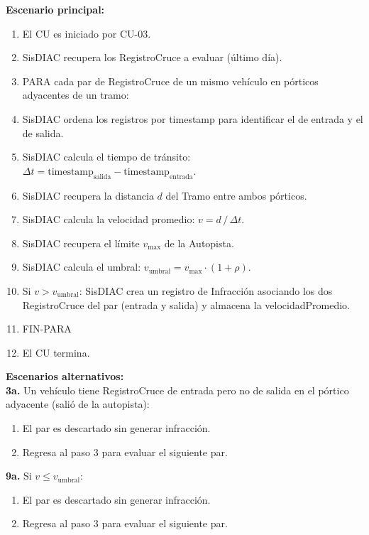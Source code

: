 \documentclass[12pt,letterpaper]{article}
\begin{document}
\noindent \textbf{Escenario principal:}
\begin{enumerate}[nosep, leftmargin=*]
	\item El CU es iniciado por CU-03.
	\item SisDIAC recupera los RegistroCruce a evaluar (último día).
	\item PARA cada par de RegistroCruce de un mismo vehículo en pórticos adyacentes de un tramo:
	\item SisDIAC ordena los registros por timestamp para identificar el de entrada y el de salida.
	\item SisDIAC calcula el tiempo de tránsito: $\Delta t = \text{timestamp}_{\text{salida}} - \text{timestamp}_{\text{entrada}}$.
	\item SisDIAC recupera la distancia $d$ del Tramo entre ambos pórticos.
	\item SisDIAC calcula la velocidad promedio: $v = d\,/\,\Delta t$.
	\item SisDIAC recupera el límite $v_{\text{max}}$ de la Autopista.
	\item SisDIAC calcula el umbral: $v_{\text{umbral}} = v_{\text{max}} \cdot (1 + \rho)$.
	\item Si $v > v_{\text{umbral}}$: SisDIAC crea un registro de Infracción asociando los dos RegistroCruce del par (entrada y salida) y almacena la velocidadPromedio.
	\item FIN-PARA
	\item El CU termina.
\end{enumerate}

\noindent \textbf{Escenarios alternativos:} \\
\textbf{3a.} Un vehículo tiene RegistroCruce de entrada pero no de salida en el pórtico adyacente (salió de la autopista):
\begin{enumerate}[nosep]
	\item[3a1.] El par es descartado sin generar infracción.
	\item[3a2.] Regresa al paso 3 para evaluar el siguiente par.
\end{enumerate}
\textbf{9a.} Si $v \leq v_{\text{umbral}}$:
\begin{enumerate}[nosep]
	\item[9a1.] El par es descartado sin generar infracción.
	\item[9a2.] Regresa al paso 3 para evaluar el siguiente par.
\end{enumerate}


\newpage
\end{document}

